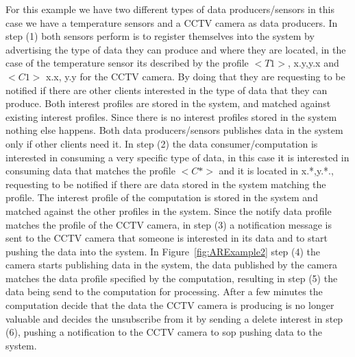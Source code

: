 For this example we have two different types of data producers/sensors in this case we have a temperature sensors and a CCTV camera as data producers. In step (1) both sensors perform is to register themselves into the system by advertising the type of data they can produce and where they are located, in the case of the temperature sensor its described by the profile $<T1>$, x.y,y.x and $<C1>$ x.x, y.y for the CCTV camera. By doing that they are requesting to be notified if there are other clients interested in the type of data that they can produce. Both interest profiles are stored in the system, and matched against existing interest profiles. Since there is no interest profiles stored in the system nothing else happens. Both data producers/sensors publishes data in the system only if other clients need it. In step (2) the data consumer/computation is interested in consuming a very specific type of data, in this case it is interested in consuming data that matches the profile $<C*>$ and it is located in x.*,y.*.,  requesting to be notified if there are data stored in the system matching the profile. The interest profile of the computation is stored in the system and matched against the other profiles in the system. Since the notify data profile matches the profile of the CCTV camera, in step (3) a notification message is sent to the CCTV camera that someone is interested in its data and to start pushing the data into the system. In Figure~\ref{fig:ARExample2} step (4) the camera starts publishing data in the system, the data published by the camera matches the data profile specified by the computation,  resulting in step (5) the data being send to the computation for processing. After a few minutes the computation decide that the data the CCTV camera is producing is no longer valuable and decides the unsubscribe from it by sending a delete interest in step (6), pushing a notification to the CCTV camera to sop pushing data to the system.

